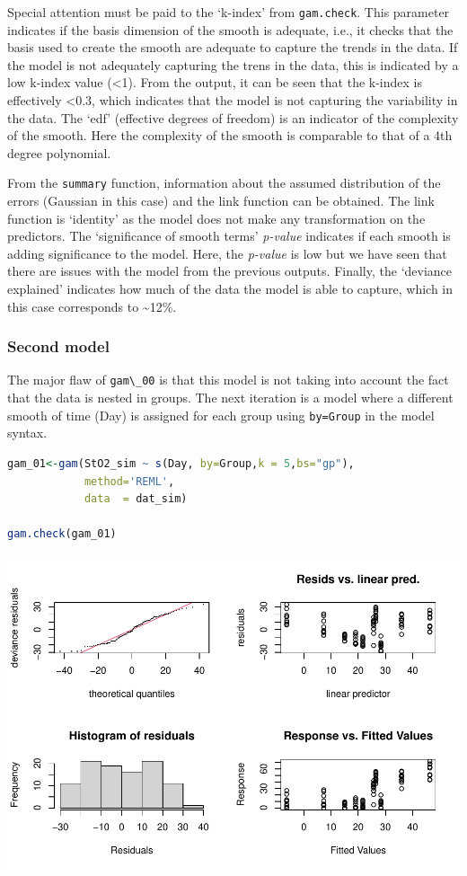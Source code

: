 \documentclass[
]{article}
\newcommand{\passthrough}[1]{#1}
\begin{document}
Special attention must be paid to the `k-index' from \passthrough{\lstinline!gam.check!}. This parameter indicates if the basis dimension of the smooth is adequate, i.e., it checks that the basis used to create the smooth are adequate to capture the trends in the data. If the model is not adequately capturing the trens in the data, this is indicated by a low k-index value (\textless1). From the output, it can be seen that the k-index is effectively \textless0.3, which indicates that the model is not capturing the variability in the data. The `edf' (effective degrees of freedom) is an indicator of the complexity of the smooth. Here the complexity of the smooth is comparable to that of a 4th degree polynomial.

From the \passthrough{\lstinline!summary!} function, information about the assumed distribution of the errors (Gaussian in this case) and the link function can be obtained. The link function is `identity' as the model does not make any transformation on the predictors. The `significance of smooth terms' \emph{p-value} indicates if each smooth is adding significance to the model. Here, the \emph{p-value} is low but we have seen that there are issues with the model from the previous outputs. Finally, the `deviance explained' indicates how much of the data the model is able to capture, which in this case corresponds to \textasciitilde12\%.

\hypertarget{second-model}{%
\subsubsection{Second model}\label{second-model}}

The major flaw of \passthrough{\lstinline!gam\_00!} is that this model is not taking into account the fact that the data is nested in groups. The next iteration is a model where a different smooth of time (Day) is assigned for each group using \passthrough{\lstinline!by=Group!} in the model syntax.

\begin{lstlisting}[language=R]
gam_01<-gam(StO2_sim ~ s(Day, by=Group,k = 5,bs="gp"),
            method='REML',
            data  = dat_sim)

gam.check(gam_01)
\end{lstlisting}

\includegraphics{Full_document_files/figure-latex/second-GAM-1}
\end{document}

